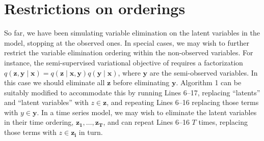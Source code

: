 \documentclass{article}
\begin{document}
\section{Restrictions on orderings}
So far, we have been simulating variable elimination on the latent variables in the model, stopping at the observed ones. In special cases, we may wish to further restrict the variable elimination ordering within the non-observed variables. For instance, the semi-supervised variational objective of \citet{Kingma2014Semi} requires a factorization $q(\mathbf{z},\mathbf{y}\mid\mathbf{x})=q(\mathbf{z}\mid\mathbf{x},\mathbf{y})q(\mathbf{y}\mid\mathbf{x})$, where $\mathbf{y}$ are the semi-observed variables. In this case we should eliminate all $\mathbf{z}$ before eliminating $\mathbf{y}$. Algorithm 1 can be suitably modified to accommodate this by running Lines 6--17, replacing ``latents'' and ``latent variables'' with $z\in\mathbf{z}$, and repeating Lines 6--16 replacing those terms with $y\in\mathbf{y}$. In a time series model, we may wish to eliminate the latent variables in their time ordering, $\mathbf{z_1},\ldots,\mathbf{z_T}$, and can repeat Lines 6--16 $T$ times, replacing those terms with $z\in\mathbf{z_i}$ in turn.
\end{document}
